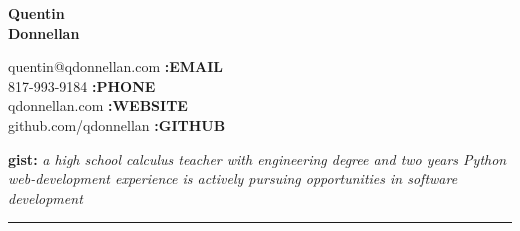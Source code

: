 \documentclass{article}
\begin{document}
\begin{multicols}{2}

{\bfseries
	{\Huge Quentin } \\
	{\Huge Donnellan }
}
\columnbreak


{\raggedleft
	quentin@qdonnellan.com {\bf :EMAIL}\\
	817-993-9184 {\bf :PHONE}\\
	qdonnellan.com {\bf :WEBSITE}\\
	github.com/qdonnellan {\bf :GITHUB}\\
}


\end{multicols}
\textbf{\large gist:} \textit{\large a high school calculus teacher with engineering degree and two years Python web-development experience is actively pursuing opportunities in software development }
\begin{center}
\rule{\textwidth}{8pt}
\end{center}
\end{document}
